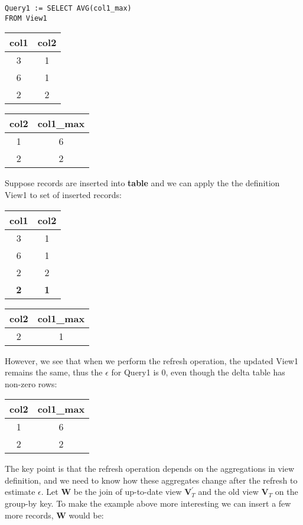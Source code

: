 \begin{lstlisting}
Query1 := SELECT AVG(col1_max) 
FROM View1 
\end{lstlisting}


\begin{center}
\begin{tabular}{|c|c|}
\hline 
col1 & col2\tabularnewline
\hline 
\hline 
3 & 1\tabularnewline
\hline 
6 & 1\tabularnewline
\hline 
2 & 2\tabularnewline
\hline 
\end{tabular} %
\begin{tabular}{|c|c|}
\hline 
col2 & col1\_max\tabularnewline
\hline 
\hline 
1 & 6\tabularnewline
\hline 
2 & 2\tabularnewline
\hline 
\end{tabular}
\par\end{center}

Suppose records are inserted into \textbf{table} and we can apply
the the definition View1 to set of inserted records:

\begin{center}
\begin{tabular}{|c|c|}
\hline 
col1 & col2\tabularnewline
\hline 
\hline 
3 & 1\tabularnewline
\hline 
6 & 1\tabularnewline
\hline 
2 & 2\tabularnewline
\hline 
\textbf{2} & \textbf{1}\tabularnewline
\hline 
\end{tabular} %
\begin{tabular}{|c|c|}
\hline 
col2 & col1\_max\tabularnewline
\hline 
\hline 
2 & 1\tabularnewline
\hline 
\end{tabular}
\par\end{center}

However, we see that when we perform the refresh operation, the updated
View1 remains the same, thus the $\epsilon$ for Query1 is 0, even
though the delta table has non-zero rows:

\begin{center}
\begin{tabular}{|c|c|}
\hline 
col2 & col1\_max\tabularnewline
\hline 
\hline 
1 & 6\tabularnewline
\hline 
2 & 2\tabularnewline
\hline 
\end{tabular}
\par\end{center}

The key point is that the refresh operation depends on the aggregations
in view definition, and we need to know how these aggregates change
after the refresh to estimate $\epsilon$. Let $\textbf{W}$ be the
join of up-to-date view $\textbf{V}_{T}^{'}$ and the old view $\textbf{V}_{T}$
on the group-by key. To make the example above more interesting we
can insert a few more records, $\textbf{W}$ would be:

